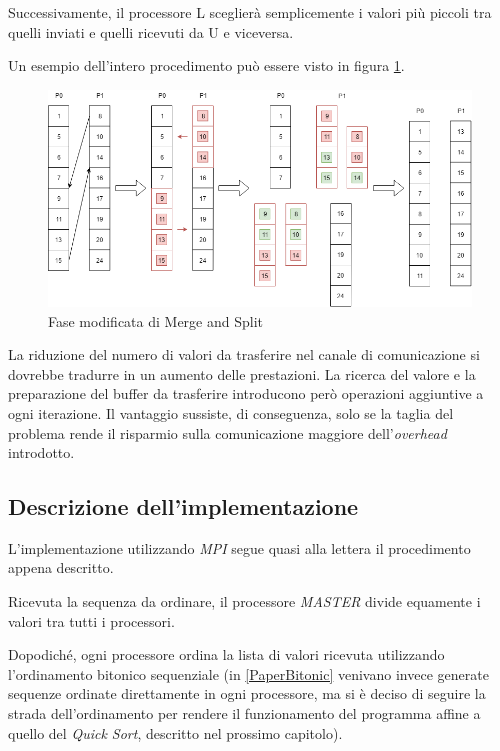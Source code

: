 Successivamente, il processore L sceglierà semplicemente i valori più piccoli tra quelli inviati e quelli ricevuti da U e viceversa.

Un esempio dell'intero procedimento può essere visto in figura \ref{mergeAndSplit}.

\begin{figure}[h!]
  \centering
  \includegraphics[width=\linewidth]{Images/mergeAndSplit.png}
  \caption{Fase modificata di Merge and Split}
  \label{mergeAndSplit}
\end{figure}

La riduzione del numero di valori da trasferire nel canale di comunicazione si dovrebbe tradurre in un aumento delle prestazioni. La ricerca del valore e la preparazione del buffer da trasferire introducono però operazioni aggiuntive a ogni iterazione. Il vantaggio sussiste, di conseguenza, solo se la taglia del problema rende il risparmio sulla comunicazione maggiore dell'\textit{overhead} introdotto.

\subsection{Descrizione dell'implementazione}

L'implementazione utilizzando \textit{MPI} segue quasi alla lettera il procedimento appena descritto.

Ricevuta la sequenza da ordinare, il processore \textit{MASTER} divide equamente i valori tra tutti i processori.

Dopodiché, ogni processore ordina la lista di valori ricevuta utilizzando l'ordinamento bitonico sequenziale (in \ref{PaperBitonic} venivano invece generate sequenze ordinate direttamente in ogni processore, ma si è deciso di seguire la strada dell'ordinamento per rendere il funzionamento del programma affine a quello del \textit{Quick Sort}, descritto nel prossimo capitolo).

